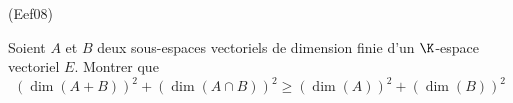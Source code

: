 \begin{tiny}(Eef08)\end{tiny} Soient $A$ et $B$ deux sous-espaces vectoriels de dimension finie d'un $\K$-espace vectoriel $E$. Montrer que
\begin{displaymath}
(\dim(A+B))^2 + (\dim(A\cap B))^2 \geq (\dim(A))^2 + (\dim(B))^2
\end{displaymath}
